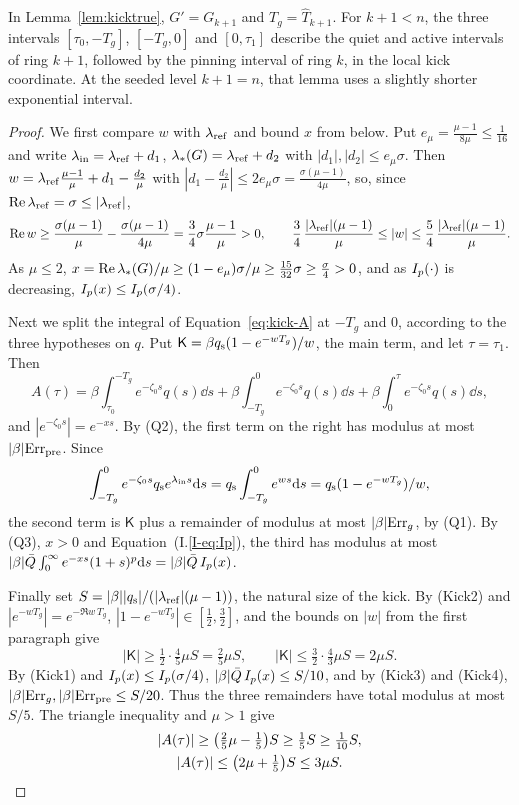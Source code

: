 In Lemma~\ref{lem:kicktrue}, $G'=G_{k+1}$ and $T_g=\hat T_{k+1}$.
For $k+1<n$, the three intervals $[\tau_0,-T_g]$, $[-T_g,0]$ and
$[0,\tau_1]$ describe the quiet and active intervals of ring $k+1$, followed
by the pinning interval of ring $k$, in the local kick coordinate. At the
seeded level $k+1=n$, that lemma uses a slightly shorter exponential
interval.

\begin{proof}
We first compare $w$ with $\lambda_{\mathrm{ref}}$ and bound $x$ from below. Put
$e_\mu=\frac{\mu-1}{8\mu}\le\frac1{16}$ and write $\lambda_{\mathrm{in}}=\lambda_{\mathrm{ref}}+d_1$,
$\lambda_*(G)=\lambda_{\mathrm{ref}}+d_2$ with $|d_1|,|d_2|\le e_\mu\sigma$. Then
$w=\lambda_{\mathrm{ref}}\frac{\mu-1}\mu+d_1-\frac{d_2}\mu$ with
$|d_1-\frac{d_2}\mu|\le2e_\mu\sigma=\frac{\sigma(\mu-1)}{4\mu}$, so, since
$\Re \lambda_{\mathrm{ref}}=\sigma\le|\lambda_{\mathrm{ref}}|$,
\[
\Re w\ge\frac{\sigma(\mu-1)}\mu-\frac{\sigma(\mu-1)}{4\mu}=\frac34\sigma\frac{\mu-1}\mu>0,\qquad
\frac34\,\frac{|\lambda_{\mathrm{ref}}|(\mu-1)}\mu\le|w|\le\frac54\,\frac{|\lambda_{\mathrm{ref}}|(\mu-1)}\mu .
\]
As $\mu\le2$, $x=\Re\lambda_*(G)/\mu\ge(1-e_\mu)\sigma/\mu\ge\frac{15}{32}\sigma\ge\frac\sigma4>0$,
and as $I_{p}(\cdot)$ is decreasing, $I_{p}(x)\le I_{p}(\sigma/4)$.

Next we split the integral of Equation~\eqref{eq:kick-A} at $-T_g$ and $0$,
according to the three hypotheses on $q$. Put $\mathsf K=\beta q_{\mathrm{s}}(1-e^{-wT_g})/w$,
the main term, and let $\tau=\tau_1$. Then
\[
A(\tau)=\beta\int_{\tau_0}^{-T_g}e^{-\zeta_0s}q(s)\dd s+\beta\int_{-T_g}^0e^{-\zeta_0s}q(s)\dd s
+\beta\int_0^\tau e^{-\zeta_0s}q(s)\dd s ,
\]
and $|e^{-\zeta_0s}|=e^{-xs}$. By (Q2), the
first term on the right has modulus at most $|\beta|\mathrm{Err}_{\mathrm{pre}}$. Since
\[
\int_{-T_g}^0e^{-\zeta_0s}q_{\mathrm{s}} e^{\lambda_{\mathrm{in}}s}\dd s=q_{\mathrm{s}}\int_{-T_g}^0e^{ws}\dd s=q_{\mathrm{s}}(1-e^{-wT_g})/w,
\]
the second term is $\mathsf K$ plus a remainder of modulus at most
$|\beta|\mathrm{Err}_g$, by (Q1). By (Q3), $x>0$ and Equation~(I.\ref{I-eq:Ip}), the third
has modulus at most
$|\beta|\bar Q\int_0^\infty e^{-xs}(1+s)^p\dd s=|\beta|\bar Q\,I_{p}(x)$.

Finally set $S=|\beta||q_{\mathrm{s}}|/(|\lambda_{\mathrm{ref}}|(\mu-1))$, the natural size of the kick.
By (Kick2) and $|e^{-wT_g}|=e^{-\Re w\,T_g}$, $|1-e^{-wT_g}|\in[\frac12,\frac32]$,
and the bounds on $|w|$ from the first paragraph give
\[
|\mathsf K|\ge\tfrac12\cdot\tfrac45\mu S=\tfrac25\mu S,\qquad
|\mathsf K|\le\tfrac32\cdot\tfrac43\mu S=2\mu S.
\]
By (Kick1) and $I_{p}(x)\le I_{p}(\sigma/4)$,
$|\beta|\bar Q\,I_{p}(x)\le S/10$, and by (Kick3) and (Kick4),
$|\beta|\mathrm{Err}_g,|\beta|\mathrm{Err}_{\mathrm{pre}}\le S/20$. Thus the three remainders have total
modulus at most $S/5$. The triangle inequality and $\mu>1$ give
\begin{gather*}
|A(\tau)|\ge\big(\tfrac25\mu-\tfrac15\big)S\ge\tfrac15 S\ge\tfrac1{10}S,\\
|A(\tau)|\le\big(2\mu+\tfrac15\big)S\le3\mu S.\qedhere
\end{gather*}
\end{proof}
